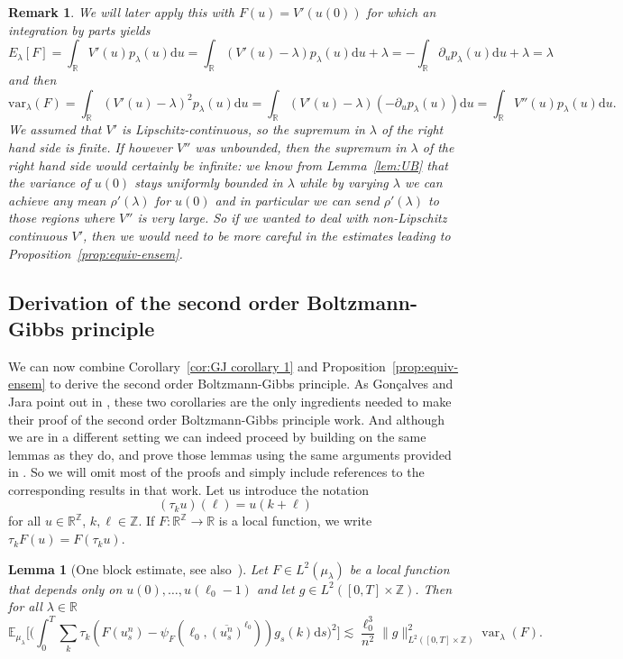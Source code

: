 \documentclass[11pt, a4paper]{article}
\newcommand{\mathd}{\mathrm{d}}
\newcommand{\tmop}[1]{\ensuremath{\operatorname{#1}}}
\newtheorem{lemma}[theorem]{Lemma}
\newtheorem{remark}[theorem]{Remark}
\newcommand{\dd}{\mathrm{d}}
\newcommand{\R}{\mathbb{R}}
\newcommand{\1}{\mathbf{1}}
\begin{document}
\begin{remark}
   We will later apply this with $F(u) = V'(u(0))$ for which an integration by parts yields
   \[
      E_\lambda[F] = \int_\R V'(u) p_{\lambda}(u) \dd u = \int_\R ( V'(u) - \lambda) p_{\lambda}(u) \dd u + \lambda = - \int_\R \partial_u p_{\lambda}(u) \dd u + \lambda =\lambda
   \]
   and then
   \[
      \mathrm{var}_\lambda(F) = \int_\R (V'(u) - \lambda)^2 p_{\lambda}(u) \dd u = \int_\R ( V'(u) - \lambda)(- \partial_u p_{\lambda}(u)) \dd u  =  \int_\R V''(u) p_{\lambda}(u) \dd u.
   \]
   We assumed that $V'$ is Lipschitz-continuous, so the supremum in $\lambda$ of the right hand side is finite. If however $V''$ was unbounded, then the supremum in $\lambda$ of the right hand side would certainly be infinite: we know from Lemma~\ref{lem:UB} that the variance of $u(0)$ stays uniformly bounded in $\lambda$ while by varying $\lambda$ we can achieve any mean $\rho'(\lambda)$ for $u(0)$ and in particular we can send $\rho'(\lambda)$ to those regions where $V''$ is very large. So if we wanted to deal with non-Lipschitz continuous $V'$, then we would need to be more careful in the estimates leading to Proposition~\ref{prop:equiv-ensem}.
\end{remark}


\subsection{Derivation of the second order Boltzmann-Gibbs principle}\label{sec:BG}

We can now combine Corollary~\ref{cor:GJ corollary 1} and
Proposition~\ref{prop:equiv-ensem} to derive the second order Boltzmann-Gibbs
principle. As Gon{\c c}alves and Jara point out in \cite{bib:goncalvesJara},
these two corollaries are the only ingredients needed to make their proof of
the second order Boltzmann-Gibbs principle work. And although we are in a
different setting we can indeed proceed by building on the same lemmas as they do, and prove those lemmas using the same arguments provided in
\cite{bib:goncalvesJara}. So we will omit most of the proofs and simply include
references to the corresponding results in that work.
%
Let us introduce the notation
\[ (\tau_k u) (\ell) = u (k + \ell) \]
for all $u \in \mathbb{R}^{\mathbb{Z}}$, $k, \ell \in \mathbb{Z}$. If $F :
\mathbb{R}^{\mathbb{Z}} \rightarrow \mathbb{R}$ is a local function, we
write $\tau_k F (u) = F (\tau_k u)$.

\begin{lemma}[One block estimate, see also~{\cite[Lemma~1]{bib:goncalvesJara}}]
  \label{lem:one block}
  Let $F \in L^2 ({\mu}_{\lambda})$ be a local function that depends only
  on $u (0), \ldots, u (\ell_0 - 1)$ and let $g \in L^2 ([0, T] \times
  \mathbb{Z})$. Then for all $\lambda \in \mathbb{R}$
  \[ \mathbb{E}_{{\mu}_{\lambda}} \Big[ \Big( \int_0^T \sum_k \tau_k (F
     (u^n_s) - \psi_F (\ell_0, \overline{(u^n_s)}^{\ell_0})) g_s (k) \mathd s
     \Big)^2 \Big] \lesssim \frac{\ell_0^3}{n^2} \| g \|_{L^2 ([0, T]
     \times \mathbb{Z})}^2 \tmop{var}_{\lambda} (F) . \]
\end{lemma}
\end{document}
